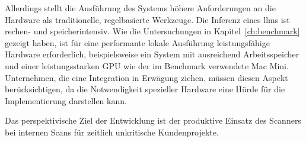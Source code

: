 Allerdings stellt die Ausführung des Systems höhere Anforderungen an die Hardware als traditionelle, regelbasierte Werkzeuge.
Die Inferenz eines \glspl{llm} ist rechen- und speicherintensiv.
Wie die Untersuchungen in Kapitel~\ref{ch:benchmark} gezeigt haben, ist für eine performante lokale Ausführung leistungsfähige Hardware erforderlich, beispielsweise ein System mit ausreichend Arbeitsspeicher und einer leistungsstarken GPU wie der im Benchmark verwendete Mac Mini.
Unternehmen, die eine Integration in Erwägung ziehen, müssen diesen Aspekt berücksichtigen, da die Notwendigkeit spezieller Hardware eine Hürde für die Implementierung darstellen kann.

Das perspektivische Ziel der Entwicklung ist der produktive Einsatz des Scanners bei internen Scans für zeitlich unkritische Kundenprojekte.
